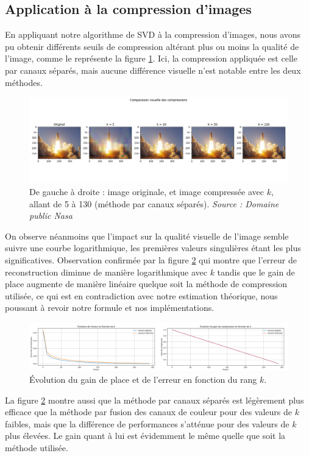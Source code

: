\documentclass{article}
\begin{document}
\subsection{Application à la compression d'images}
En appliquant notre algorithme de SVD à la compression d'images, nous avons pu obtenir différents seuils de compression altérant plus ou moins la qualité de l'image, comme le représente la figure \ref{fig:comparison}. Ici, la compression appliquée est celle par canaux séparés, mais aucune différence visuelle n'est notable entre les deux méthodes.
\begin{figure}[H]
    \centering
    \includegraphics[width=\textwidth, trim=0 3cm 0 3.7cm, clip]{comparison.png}
    \caption{De gauche à droite : image originale, et image compressée avec \( k \), allant de 5 à 130 (méthode par canaux séparés). \textit{Source : Domaine public Nasa}}
    \label{fig:comparison}
\end{figure}
On observe néanmoins que l'impact sur la qualité visuelle de l'image semble suivre une courbe logarithmique, les premières valeurs singulières étant les plus significatives. Observation confirmée par la figure \ref{fig:error_gain_plot} qui montre que l'erreur de reconstruction diminue de manière logarithmique avec \( k \) tandis que le gain de place augmente de manière linéaire quelque soit la méthode de compression utilisée, ce qui est en contradiction avec notre estimation théorique, nous poussant à revoir notre formule et nos implémentations.
\begin{figure}[H]
  \centering
  \includegraphics[width=\textwidth]{error_gain_plot2.png}
  \caption{Évolution du gain de place et de l'erreur en fonction du rang \( k \).}
  \label{fig:error_gain_plot}
\end{figure}
La figure \ref{fig:error_gain_plot} montre aussi que la méthode par canaux séparés est légèrement plus efficace que la méthode par fusion des canaux de couleur pour des valeurs de \( k \) faibles, mais que la différence de performances s'atténue pour des valeurs de \( k \) plus élevées. Le gain quant à lui est évidemment le même quelle que soit la méthode utilisée.\\
\end{document}

